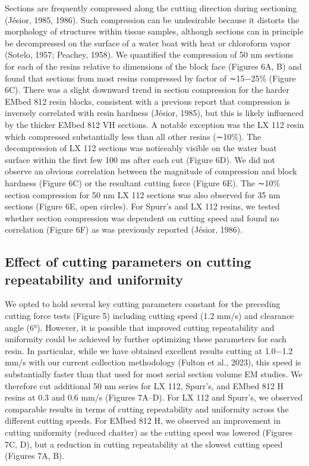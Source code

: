 \documentclass{article}
\begin{document}
Sections are frequently compressed along the cutting direction during sectioning (Jésior, 1985, 1986). Such compression can be undesirable because it distorts the morphology of structures within tissue samples, although sections can in principle be decompressed on the surface of a water boat with heat or chloroform vapor (Sotelo, 1957; Peachey, 1958). We quantified the compression of 50 nm sections for each of the resins relative to dimensions of the block face (Figures 6A, B) and found that sections from most resins compressed by factor of ∼15−25\% (Figure 6C). There was a slight downward trend in section compression for the harder EMbed 812 resin blocks, consistent with a previous report that compression is inversely correlated with resin hardness (Jésior, 1985), but this is likely influenced by the thicker EMbed 812 VH sections. A notable exception was the LX 112 resin which compressed substantially less than all other resins (∼10\%). The decompression of LX 112 sections was noticeably visible on the water boat surface within the first few 100 ms after each cut (Figure 6D). We did not observe an obvious correlation between the magnitude of compression and block hardness (Figure 6C) or the resultant cutting force (Figure 6E). The ∼10\% section compression for 50 nm LX 112 sections was also observed for 35 nm sections (Figure 6E, open circles). For Spurr’s and LX 112 resins, we tested whether section compression was dependent on cutting speed and found no correlation (Figure 6F) as was previously reported (Jésior, 1986).

\subsection*{Effect of cutting parameters on cutting repeatability and uniformity}

We opted to hold several key cutting parameters constant for the preceding cutting force tests (Figure 5) including cutting speed (1.2 mm/s) and clearance angle (6°). However, it is possible that improved cutting repeatability and uniformity could be achieved by further optimizing these parameters for each resin. In particular, while we have obtained excellent results cutting at 1.0−1.2 mm/s with our current collection methodology (Fulton et al., 2023), this speed is substantially faster than that used for most serial section volume EM studies. We therefore cut additional 50 nm series for LX 112, Spurr’s, and EMbed 812 H resins at 0.3 and 0.6 mm/s (Figures 7A–D). For LX 112 and Spurr’s, we observed comparable results in terms of cutting repeatability and uniformity across the different cutting speeds. For EMbed 812 H, we observed an improvement in cutting uniformity (reduced chatter) as the cutting speed was lowered (Figures 7C, D), but a reduction in cutting repeatability at the slowest cutting speed (Figures 7A, B).
\end{document}
